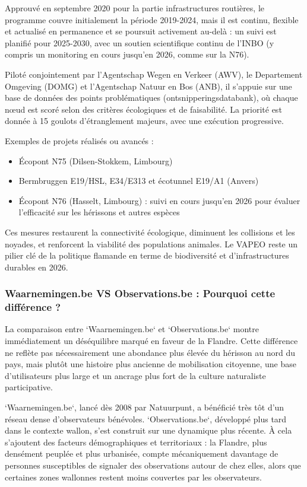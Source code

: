 \documentclass[a4paper,11pt]{article}
\begin{document}
Approuvé en septembre 2020 pour la partie infrastructures routières, le programme couvre initialement la période 2019-2024, mais il est continu, flexible et actualisé en permanence et se poursuit activement au-delà : un suivi est planifié pour 2025-2030, avec un soutien scientifique continu de l’INBO (y compris un monitoring en cours jusqu’en 2026, comme sur la N76).

Piloté conjointement par l’Agentschap Wegen en Verkeer (AWV), le Departement Omgeving (DOMG) et l’Agentschap Natuur en Bos (ANB), il s’appuie sur une base de données des points problématiques (ontsnipperingsdatabank), où chaque nœud est scoré selon des critères écologiques et de faisabilité. La priorité est donnée à 15 goulots d’étranglement majeurs, avec une exécution progressive.

Exemples de projets réalisés ou avancés :
\begin{itemize}
    \item Écopont N75 (Dilsen-Stokkem, Limbourg)
    \item Bermbruggen E19/HSL, E34/E313 et écotunnel E19/A1 (Anvers)
    \item Écopont N76 (Hasselt, Limbourg) : suivi en cours jusqu’en 2026 pour évaluer l’efficacité sur les hérissons et autres espèces
\end{itemize}

Ces mesures restaurent la connectivité écologique, diminuent les collisions et les noyades, et renforcent la viabilité des populations animales. Le VAPEO reste un pilier clé de la politique flamande en terme de biodiversité et d’infrastructures durables en 2026.

\subsubsection{Waarnemingen.be VS Observations.be : Pourquoi cette différence ?}

La comparaison entre `Waarnemingen.be` et `Observations.be` montre immédiatement un déséquilibre marqué en faveur de la Flandre. Cette différence ne reflète pas nécessairement une abondance plus élevée du hérisson au nord du pays, mais plutôt une histoire plus ancienne de mobilisation citoyenne, une base d’utilisateurs plus large et un ancrage plus fort de la culture naturaliste participative.

`Waarnemingen.be`, lancé dès 2008 par Natuurpunt, a bénéficié très tôt d’un réseau dense d’observateurs bénévoles. `Observations.be`, développé plus tard dans le contexte wallon, s’est construit sur une dynamique plus récente. À cela s’ajoutent des facteurs démographiques et territoriaux : la Flandre, plus densément peuplée et plus urbanisée, compte mécaniquement davantage de personnes susceptibles de signaler des observations autour de chez elles, alors que certaines zones wallonnes restent moins couvertes par les observateurs.
\end{document}
